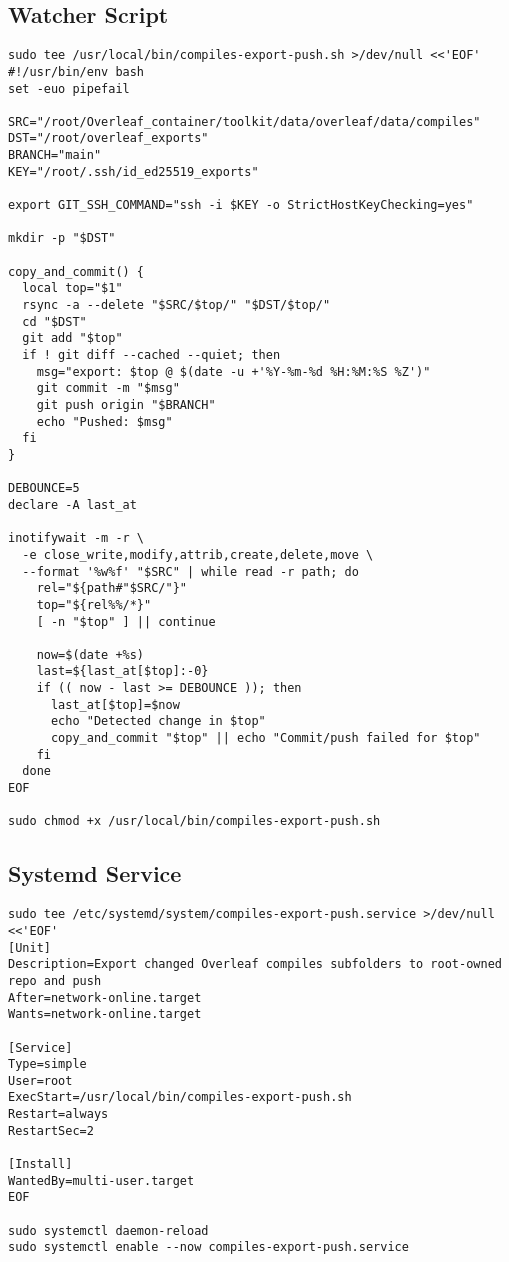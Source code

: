\subsection*{Watcher Script}

\begin{verbatim}
sudo tee /usr/local/bin/compiles-export-push.sh >/dev/null <<'EOF'
#!/usr/bin/env bash
set -euo pipefail

SRC="/root/Overleaf_container/toolkit/data/overleaf/data/compiles"
DST="/root/overleaf_exports"
BRANCH="main"
KEY="/root/.ssh/id_ed25519_exports"

export GIT_SSH_COMMAND="ssh -i $KEY -o StrictHostKeyChecking=yes"

mkdir -p "$DST"

copy_and_commit() {
  local top="$1"
  rsync -a --delete "$SRC/$top/" "$DST/$top/"
  cd "$DST"
  git add "$top"
  if ! git diff --cached --quiet; then
    msg="export: $top @ $(date -u +'%Y-%m-%d %H:%M:%S %Z')"
    git commit -m "$msg"
    git push origin "$BRANCH"
    echo "Pushed: $msg"
  fi
}

DEBOUNCE=5
declare -A last_at

inotifywait -m -r \
  -e close_write,modify,attrib,create,delete,move \
  --format '%w%f' "$SRC" | while read -r path; do
    rel="${path#"$SRC/"}"
    top="${rel%%/*}"
    [ -n "$top" ] || continue

    now=$(date +%s)
    last=${last_at[$top]:-0}
    if (( now - last >= DEBOUNCE )); then
      last_at[$top]=$now
      echo "Detected change in $top"
      copy_and_commit "$top" || echo "Commit/push failed for $top"
    fi
  done
EOF

sudo chmod +x /usr/local/bin/compiles-export-push.sh
\end{verbatim}

\subsection*{Systemd Service}

\begin{verbatim}
sudo tee /etc/systemd/system/compiles-export-push.service >/dev/null <<'EOF'
[Unit]
Description=Export changed Overleaf compiles subfolders to root-owned repo and push
After=network-online.target
Wants=network-online.target

[Service]
Type=simple
User=root
ExecStart=/usr/local/bin/compiles-export-push.sh
Restart=always
RestartSec=2

[Install]
WantedBy=multi-user.target
EOF

sudo systemctl daemon-reload
sudo systemctl enable --now compiles-export-push.service
\end{verbatim}

